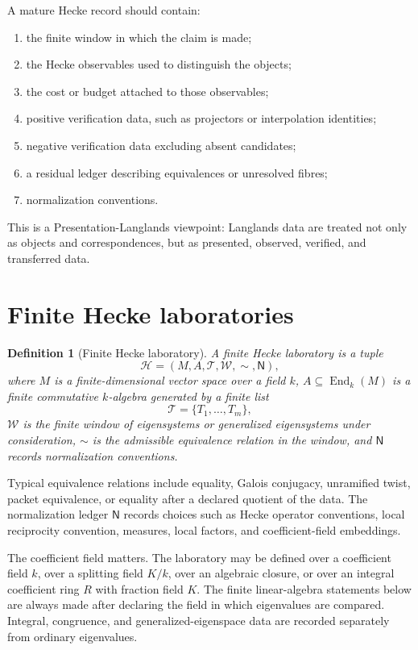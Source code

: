 \documentclass[11pt]{article}
\newtheorem{definition}[theorem]{Definition}
\DeclareMathOperator{\End}{End}
\begin{document}
A mature Hecke record should contain:
\begin{enumerate}[label=\textup{(\roman*)}]
\item the finite window in which the claim is made;
\item the Hecke observables used to distinguish the objects;
\item the cost or budget attached to those observables;
\item positive verification data, such as projectors or interpolation identities;
\item negative verification data excluding absent candidates;
\item a residual ledger describing equivalences or unresolved fibres;
\item normalization conventions.
\end{enumerate}

This is a Presentation-Langlands viewpoint: Langlands data are treated not only as objects and correspondences, but as presented, observed, verified, and transferred data.

\section{Finite Hecke laboratories}

\begin{definition}[Finite Hecke laboratory]
A finite Hecke laboratory is a tuple
\[
\mathcal H=(M,A,\mathcal T,\mathcal W,\sim,\mathsf N),
\]
where \(M\) is a finite-dimensional vector space over a field \(k\), \(A\subseteq \End_k(M)\) is a finite commutative \(k\)-algebra generated by a finite list
\[
\mathcal T=\{T_1,\ldots,T_m\},
\]
\(\mathcal W\) is the finite window of eigensystems or generalized eigensystems under consideration, \(\sim\) is the admissible equivalence relation in the window, and \(\mathsf N\) records normalization conventions.
\end{definition}

Typical equivalence relations include equality, Galois conjugacy, unramified twist, packet equivalence, or equality after a declared quotient of the data.  The normalization ledger \(\mathsf N\) records choices such as Hecke operator conventions, local reciprocity convention, measures, local factors, and coefficient-field embeddings.

The coefficient field matters.  The laboratory may be defined over a coefficient field \(k\), over a splitting field \(K/k\), over an algebraic closure, or over an integral coefficient ring \(R\) with fraction field \(K\).  The finite linear-algebra statements below are always made after declaring the field in which eigenvalues are compared.  Integral, congruence, and generalized-eigenspace data are recorded separately from ordinary eigenvalues.
\end{document}
